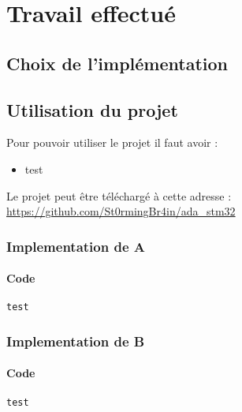 \section{Travail effectué}

\subsection{Choix de l'implémentation}

\subsection{Utilisation du projet}

Pour pouvoir utiliser le projet il faut avoir :
\begin{itemize}
    \item test
\end{itemize}

\begin{noindent}
Le projet peut être téléchargé à cette adresse : \\ 
\url{https://github.com/St0rmingBr4in/ada_stm32}
\end{noindent}

\newpage

\subsubsection{Implementation de A}

\paragraph{Code}
\noindent
\begin{centering}


\begin{lstlisting}
test
\end{lstlisting}
\end{centering}
\newpage

\subsubsection{Implementation de B}

\paragraph{Code}
\noindent
\begin{centering}


\begin{lstlisting}
test
\end{lstlisting}
\end{centering}
\newpage
